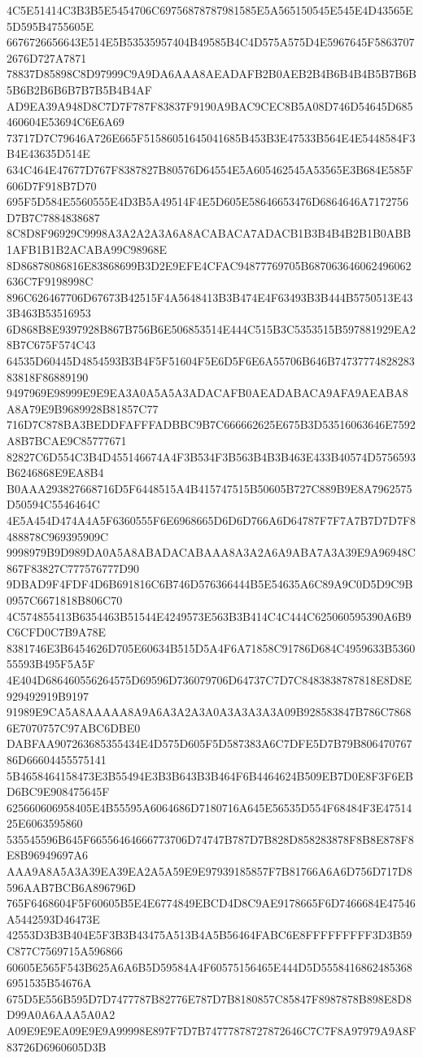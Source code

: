 {{{{{{{{{{{{{{{{{{{{{4C5E51414C3B3B5E5454706C69756878787981585E5A565150545E545E4D43565E5D595B4755605E
6676726656643E514E5B53535957404B49585B4C4D575A575D4E5967645F58637072676D727A7871
78837D85898C8D97999C9A9DA6AAA8AEADAFB2B0AEB2B4B6B4B4B5B7B6B5B6B2B6B6B7B7B5B4B4AF
AD9EA39A948D8C7D7F787F83837F9190A9BAC9CEC8B5A08D746D54645D685460604E53694C6E6A69
73717D7C79646A726E665F51586051645041685B453B3E47533B564E4E5448584F3B4E43635D514E
634C464E47677D767F8387827B80576D64554E5A605462545A53565E3B684E585F606D7F918B7D70
695F5D584E5560555E4D3B5A49514F4E5D605E58646653476D6864646A7172756D7B7C7884838687
8C8D8F96929C9998A3A2A2A3A6A8ACABACA7ADACB1B3B4B4B2B1B0ABB1AFB1B1B2ACABA99C98968E
8D86878086816E83868699B3D2E9EFE4CFAC94877769705B687063646062496062636C7F9198998C
896C626467706D67673B42515F4A5648413B3B474E4F63493B3B444B5750513E433B463B53516953
6D868B8E9397928B867B756B6E506853514E444C515B3C5353515B597881929EA28B7C675F574C43
64535D60445D4854593B3B4F5F51604F5E6D5F6E6A55706B646B7473777482828383818F86889190
9497969E98999E9E9EA3A0A5A5A3ADACAFB0AEADABACA9AFA9AEABA8A8A79E9B9689928B81857C77
716D7C878BA3BEDDFAFFFADBBC9B7C666662625E675B3D53516063646E7592A8B7BCAE9C85777671
82827C6D554C3B4D455146674A4F3B534F3B563B4B3B463E433B40574D5756593B6246868E9EA8B4
B0AAA293827668716D5F6448515A4B415747515B50605B727C889B9E8A7962575D50594C5546464C
4E5A454D474A4A5F6360555F6E6968665D6D6D766A6D64787F7F7A7B7D7D7F8488878C969395909C
9998979B9D989DA0A5A8ABADACABAAA8A3A2A6A9ABA7A3A39E9A96948C867F83827C777576777D90
9DBAD9F4FDF4D6B691816C6B746D576366444B5E54635A6C89A9C0D5D9C9B0957C6671818B806C70
4C574855413B6354463B51544E4249573E563B3B414C4C444C625060595390A6B9C6CFD0C7B9A78E
8381746E3B6454626D705E60634B515D5A4F6A71858C91786D684C4959633B536055593B495F5A5F
4E404D686460556264575D69596D736079706D64737C7D7C8483838787818E8D8E929492919B9197
91989E9CA5A8AAAAA8A9A6A3A2A3A0A3A3A3A3A09B928583847B786C78686E7070757C97ABC6DBE0
DABFAA907263685355434E4D575D605F5D587383A6C7DFE5D7B79B80647076786D66604455575141
5B4658464158473E3B55494E3B3B643B3B464F6B4464624B509EB7D0E8F3F6EBD6BC9E908475645F
625660606958405E4B55595A6064686D7180716A645E56535D554F68484F3E4751425E6063595860
535545596B645F66556464666773706D74747B787D7B828D858283878F8B8E878F8E8B96949697A6
AAA9A8A5A3A39EA39EA2A5A59E9E97939185857F7B81766A6A6D756D717D8596AAB7BCB6A896796D
765F6468604F5F60605B5E4E6774849EBCD4D8C9AE9178665F6D7466684E47546A5442593D46473E
42553D3B3B404E5F3B3B43475A513B4A5B56464FABC6E8FFFFFFFFF3D3B59C877C7569715A596866
60605E565F543B625A6A6B5D59584A4F60575156465E444D5D55584168624853686951535B54676A
675D5E556B595D7D7477787B82776E787D7B8180857C85847F8987878B898E8D8D99A0A6AAA5A0A2
A09E9E9EA09E9E9A99998E897F7D7B74777878727872646C7C7F8A97979A9A8F83726D6960605D3B
}}}}}}}}}}}}}}}}}}}}}
